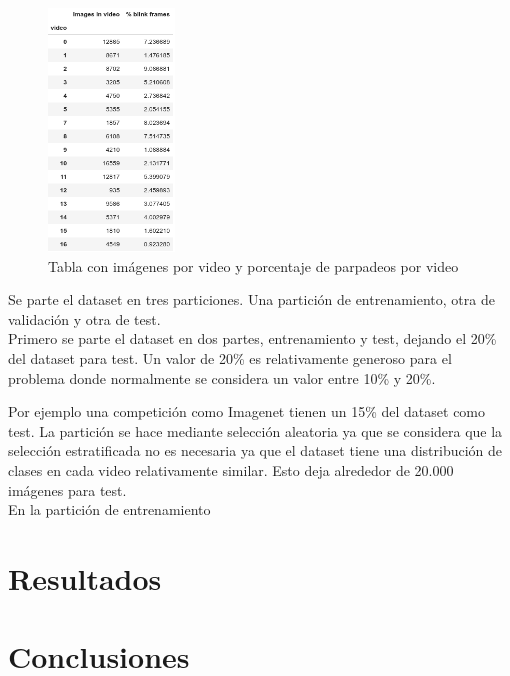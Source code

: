 \documentclass[12pt]{article}
\begin{document}
    \begin{figure} %
        \centering
        \includegraphics[width=0.3\textwidth]{drtA5y}
        \caption{Tabla con imágenes por video y porcentaje de parpadeos por video}
    \end{figure}

    Se parte el dataset en tres particiones.
    Una partición de entrenamiento, otra de validación y otra de test.\\
    Primero se parte el dataset en dos partes, entrenamiento y test, dejando el 20\% del dataset para test.
    Un valor de 20\% es relativamente generoso para el problema donde normalmente se considera un valor entre 10\% y
    20\%.

    Por ejemplo una competición como Imagenet tienen un 15\% del dataset como test\cite{imageNet}.
    La partición se hace mediante selección aleatoria ya que se considera que la selección estratificada no es
    necesaria ya que el dataset tiene una distribución de clases en cada video relativamente similar.
    Esto deja alrededor de 20.000 imágenes para test.\\
    En la partición de entrenamiento


    \section{Resultados}


    \section{Conclusiones}

    \newpage
    
    
\end{document}
